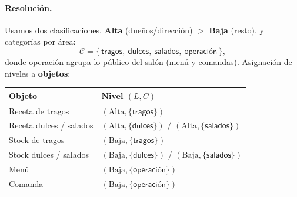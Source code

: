\paragraph{Resolución.} Usamos dos clasificaciones, \textbf{Alta} (dueños/dirección) $>$
\textbf{Baja} (resto), y categorías por área:
\[
  \mathcal{C} = \{\,\textsf{tragos},\ \textsf{dulces},\ \textsf{salados},\ \textsf{operación}\,\},
\]
donde \textsf{operación} agrupa lo público del salón (menú y comandas). Asignación de
niveles a \textbf{objetos}:
\begin{center}
\renewcommand{\arraystretch}{1.2}
\begin{tabular}{ll}
\toprule
Objeto & Nivel $(L,C)$\\
\midrule
Receta de tragos            & $(\text{Alta},\{\textsf{tragos}\})$\\
Receta dulces / salados     & $(\text{Alta},\{\textsf{dulces}\})$ / $(\text{Alta},\{\textsf{salados}\})$\\
Stock de tragos             & $(\text{Baja},\{\textsf{tragos}\})$\\
Stock dulces / salados      & $(\text{Baja},\{\textsf{dulces}\})$ / $(\text{Baja},\{\textsf{salados}\})$\\
Menú                        & $(\text{Baja},\{\textsf{operación}\})$\\
Comanda                     & $(\text{Baja},\{\textsf{operación}\})$\\
\bottomrule
\end{tabular}
\end{center}

